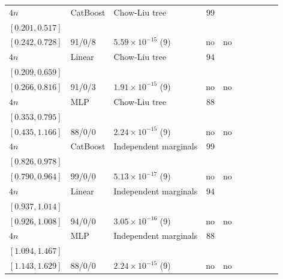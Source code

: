 \begin{longtable}{@{}ll>{\raggedright\arraybackslash}p{1.1in}rllrlll@{}}
$4n$ & CatBoost & Chow-Liu tree & 99 & \begin{tabular}[t]{@{}l@{}}$0.270$\\\tiny$[0.201, 0.517]$\end{tabular} & \begin{tabular}[t]{@{}l@{}}$0.356$\\\tiny$[0.242, 0.728]$\end{tabular} & 91/0/8 & $5.59\times 10^{-15}$ (9) & no & no \\
$4n$ & Linear & Chow-Liu tree & 94 & \begin{tabular}[t]{@{}l@{}}$0.333$\\\tiny$[0.209, 0.659]$\end{tabular} & \begin{tabular}[t]{@{}l@{}}$0.495$\\\tiny$[0.266, 0.816]$\end{tabular} & 91/0/3 & $1.91\times 10^{-15}$ (9) & no & no \\
$4n$ & MLP & Chow-Liu tree & 88 & \begin{tabular}[t]{@{}l@{}}$0.566$\\\tiny$[0.353, 0.795]$\end{tabular} & \begin{tabular}[t]{@{}l@{}}$0.658$\\\tiny$[0.435, 1.166]$\end{tabular} & 88/0/0 & $2.24\times 10^{-15}$ (9) & no & no \\
$4n$ & CatBoost & Independent marginals & 99 & \begin{tabular}[t]{@{}l@{}}$0.913$\\\tiny$[0.826, 0.978]$\end{tabular} & \begin{tabular}[t]{@{}l@{}}$0.881$\\\tiny$[0.790, 0.964]$\end{tabular} & 99/0/0 & $5.13\times 10^{-17}$ (9) & no & no \\
$4n$ & Linear & Independent marginals & 94 & \begin{tabular}[t]{@{}l@{}}$0.982$\\\tiny$[0.937, 1.014]$\end{tabular} & \begin{tabular}[t]{@{}l@{}}$0.982$\\\tiny$[0.926, 1.008]$\end{tabular} & 94/0/0 & $3.05\times 10^{-16}$ (9) & no & no \\
$4n$ & MLP & Independent marginals & 88 & \begin{tabular}[t]{@{}l@{}}$1.220$\\\tiny$[1.094, 1.467]$\end{tabular} & \begin{tabular}[t]{@{}l@{}}$1.327$\\\tiny$[1.143, 1.629]$\end{tabular} & 88/0/0 & $2.24\times 10^{-15}$ (9) & no & no \\

\end{longtable}
